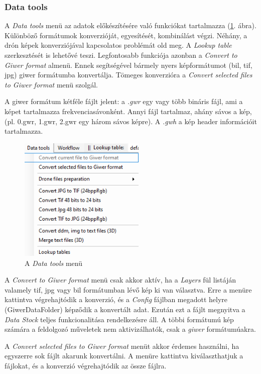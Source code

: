\documentclass[a4paper,12pt]{article}
\begin{document}
\subsubsection{Data tools}

A \textit{Data tools} menü az adatok előkészítésére való funkciókat tartalmazza (\ref{fig:datatools_menu}. ábra). Különböző formátumok konverzióját, egyesítését, kombinálást végzi. Néhány, a drón képek konverziójával kapcsolatos problémát old meg. A \textit{Lookup table} szerkesztését is lehetővé teszi. Legfontosabb funkciója azonban a \textit{Convert to Giwer format} almenü. Ennek segítségével bármely nyers képformátumot (bil, tif, jpg) giwer formátumba konvertálja. Tömeges konverzióra a \textit{Convert selected files to Giwer format} menü szolgál.

A giwer formátum kétféle fájlt jelent: a \textit{.gwr} egy vagy több bináris fájl, ami a képet tartalmazza frekvenciasávonként. Annyi fájl tartalmaz, ahány sávos a kép, (pl. 0.gwr, 1.gwr, 2.gwr egy három sávos képre). A \textit{.gwh} a kép header információit tartalmazza.

	\begin{figure}
		\centering
		\includegraphics[width=6cm]{datatools_menu.png}
		\caption{A \textit{Data tools} menü}
		\label{fig:datatools_menu}
	\end{figure}



A \textit{Convert to Giwer format} menü csak akkor aktív, ha a \textit{Layers} fül listáján valamely tif, jpg vagy bil formátumban lévő kép ki van választva. Erre a menüre kattintva végrehajtódik a konverzió, és a \textit{Config} fájlban megadott helyre (GiwerDataFolder) képződik a konvertált adat. Ezután ezt a fájlt megnyitva a \textit{Data Stock} teljes funkcionalitása rendelkezésre áll. A többi formátumú kép számára a feldolgozó műveletek nem aktivizálhatók, csak a \textit{giwer} formátumúakra.

A \textit{Convert selected files to Giwer format} menüt akkor érdemes használni, ha egyszerre sok fájlt akarunk konvertálni. A menüre kattintva kiválaszthatjuk a fájlokat, és a konverzió végrehajtódik az össze fájlra.
\end{document}
